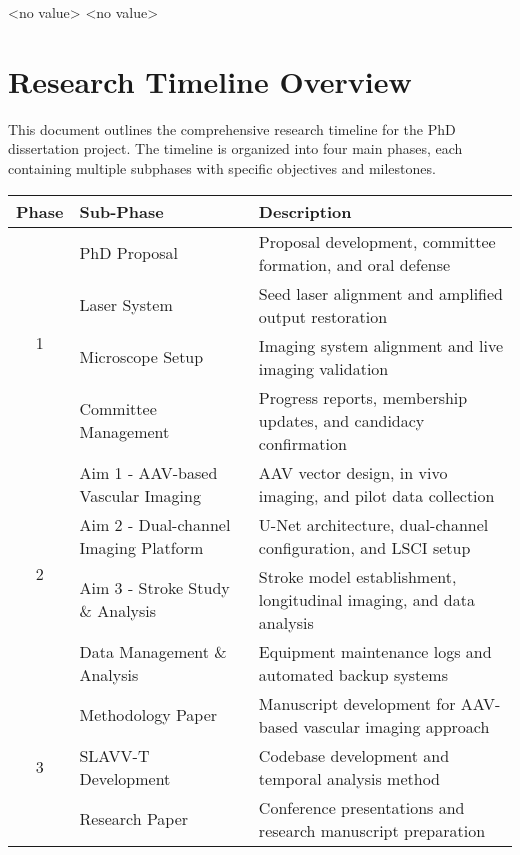 {\noindent\Large\renewcommand{\arraystretch}{\myNumArrayStretch}<no value>\hfill%
<no value>}
\myLineThick
\section*{Research Timeline Overview}
\vspace{0.5em}

This document outlines the comprehensive research timeline for the PhD dissertation project. The timeline is organized into four main phases, each containing multiple subphases with specific objectives and milestones.

\vspace{1em}

\begin{center}
\begin{tabularx}{\textwidth}{|c|X|X|}
\hline
\textbf{Phase} & \textbf{Sub-Phase} & \textbf{Description} \\
\hline
\multirow{4}{*}{1} & PhD Proposal & Proposal development, committee formation, and oral defense \\
\cline{2-3}
& Laser System & Seed laser alignment and amplified output restoration \\
\cline{2-3}
& Microscope Setup & Imaging system alignment and live imaging validation \\
\cline{2-3}
& Committee Management & Progress reports, membership updates, and candidacy confirmation \\
\hline
\multirow{4}{*}{2} & Aim 1 - AAV-based Vascular Imaging & AAV vector design, in vivo imaging, and pilot data collection \\
\cline{2-3}
& Aim 2 - Dual-channel Imaging Platform & U-Net architecture, dual-channel configuration, and LSCI setup \\
\cline{2-3}
& Aim 3 - Stroke Study \& Analysis & Stroke model establishment, longitudinal imaging, and data analysis \\
\cline{2-3}
& Data Management \& Analysis & Equipment maintenance logs and automated backup systems \\
\hline
\multirow{4}{*}{3} & Methodology Paper & Manuscript development for AAV-based vascular imaging approach \\
\cline{2-3}
& SLAVV-T Development & Codebase development and temporal analysis method \\
\cline{2-3}
& Research Paper & Conference presentations and research manuscript preparation \\

\end{tabularx}
\end{center}
